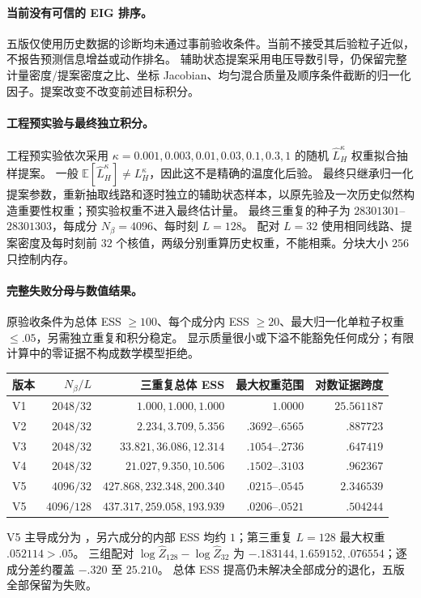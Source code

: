 \documentclass[UTF8,fontset=fandol,11pt,a4paper]{ctexart}
\begin{document}
\paragraph{当前没有可信的 EIG 排序。}
五版仅使用历史数据的诊断均未通过事前验收条件。当前不接受其后验粒子近似，不报告预测信息增益或动作排名。
辅助状态提案采用电压导数引导，仍保留完整计量密度/提案密度之比、坐标 Jacobian、均匀混合质量及顺序条件截断的归一化因子。提案改变不改变前述目标积分。

\paragraph{工程预实验与最终独立积分。}
工程预实验依次采用 $\kappa=0.001,0.003,0.01,0.03,0.1,0.3,1$ 的随机 $\widehat L_H^{\kappa}$ 权重拟合抽样提案。
一般 $\mathbb E[\widehat L_H^{\kappa}]\ne L_H^{\kappa}$，因此这不是精确的温度化后验。
最终只继承归一化提案参数，重新抽取线路和逐时独立的辅助状态样本，以原先验及一次历史似然构造重要性权重；预实验权重不进入最终估计量。
最终三重复的种子为 $28301301$--$28301303$，每成分 $N_\beta=4096$、每时刻 $L=128$。
配对 $L=32$ 使用相同线路、提案密度及每时刻前 $32$ 个核值，两级分别重算历史权重，不能相乘。分块大小 $256$ 只控制内存。

\paragraph{完整失败分母与数值结果。}
原验收条件为总体 ESS $\ge100$、每个成分内 ESS $\ge20$、最大归一化单粒子权重 $\le.05$，另需独立重复和积分稳定。
显示质量很小或下溢不能豁免任何成分；有限计算中的零证据不构成数学模型拒绝。
\begin{center}\small
\begin{tabular}{lrrrr}\toprule
版本 & $N_\beta/L$ & 三重复总体 ESS & 最大权重范围 & 对数证据跨度\\\midrule
V1 & $2048/32$ & $1.000,1.000,1.000$ & $1.0000$ & $25.561187$\\
V2 & $2048/32$ & $2.234,3.709,5.356$ & $.3692$--$.6565$ & $.887723$\\
V3 & $2048/32$ & $33.821,36.086,12.314$ & $.1054$--$.2736$ & $.647419$\\
V4 & $2048/32$ & $21.027,9.350,10.506$ & $.1502$--$.3103$ & $.962367$\\
V5 & $4096/32$ & $427.868,232.348,200.340$ & $.0215$--$.0545$ & $2.346539$\\
V5 & $4096/128$ & $437.317,259.058,193.939$ & $.0206$--$.0521$ & $.504244$\\\bottomrule
\end{tabular}\end{center}
V5 主导成分为 ，另六成分的内部 ESS 均约 $1$；第三重复 $L=128$ 最大权重 $.052114>.05$。
三组配对 $\log\widehat Z_{128}-\log\widehat Z_{32}$ 为 $-.183144,1.659152,.076554$；逐成分差约覆盖 $-.320$ 至 $25.210$。
总体 ESS 提高仍未解决全部成分的退化，五版全部保留为失败。
\end{document}
